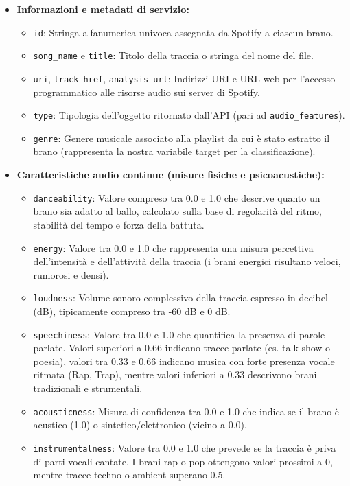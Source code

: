 \begin{itemize}
    \item \textbf{Informazioni e metadati di servizio:}
    \begin{itemize}
        \item \texttt{id}: Stringa alfanumerica univoca assegnata da Spotify a ciascun brano.
        \item \texttt{song\_name} e \texttt{title}: Titolo della traccia o stringa del nome del file.
        \item \texttt{uri}, \texttt{track\_href}, \texttt{analysis\_url}: Indirizzi URI e URL web per l'accesso programmatico alle risorse audio sui server di Spotify.
        \item \texttt{type}: Tipologia dell'oggetto ritornato dall'API (pari ad \texttt{audio\_features}).
        \item \texttt{genre}: Genere musicale associato alla playlist da cui è stato estratto il brano (rappresenta la nostra variabile target per la classificazione).
    \end{itemize}
    \item \textbf{Caratteristiche audio continue (misure fisiche e psicoacustiche):}
    \begin{itemize}
        \item \texttt{danceability}: Valore compreso tra 0.0 e 1.0 che descrive quanto un brano sia adatto al ballo, calcolato sulla base di regolarità del ritmo, stabilità del tempo e forza della battuta.
        \item \texttt{energy}: Valore tra 0.0 e 1.0 che rappresenta una misura percettiva dell'intensità e dell'attività della traccia (i brani energici risultano veloci, rumorosi e densi).
        \item \texttt{loudness}: Volume sonoro complessivo della traccia espresso in decibel (dB), tipicamente compreso tra -60 dB e 0 dB.
        \item \texttt{speechiness}: Valore tra 0.0 e 1.0 che quantifica la presenza di parole parlate. Valori superiori a 0.66 indicano tracce parlate (es. talk show o poesia), valori tra 0.33 e 0.66 indicano musica con forte presenza vocale ritmata (Rap, Trap), mentre valori inferiori a 0.33 descrivono brani tradizionali e strumentali.
        \item \texttt{acousticness}: Misura di confidenza tra 0.0 e 1.0 che indica se il brano è acustico (1.0) o sintetico/elettronico (vicino a 0.0).
        \item \texttt{instrumentalness}: Valore tra 0.0 e 1.0 che prevede se la traccia è priva di parti vocali cantate. I brani rap o pop ottengono valori prossimi a 0, mentre tracce techno o ambient superano 0.5.

\end{itemize}
\end{itemize}
